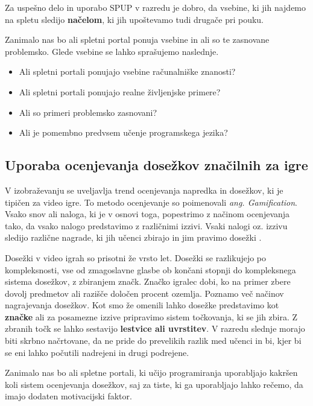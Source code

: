 Za uspešno delo in uporabo SPUP v razredu je dobro, da vsebine, ki jih
najdemo na spletu sledijo \textbf{načelom}, ki jih upoštevamo tudi
drugače pri pouku.

Zanimalo nas bo ali spletni portal ponuja vsebine in ali so te
zasnovane problemsko. Glede vsebine se lahko sprašujemo naslednje.

\begin{itemize}
\tightlist
\item Ali spletni portali ponujajo vsebine računalniške znanosti?
\item Ali spletni portali ponujajo realne življenjske primere?
\item Ali so primeri problemsko zasnovani?
\item Ali je pomembno predvsem učenje programskega jezika?
\end{itemize}

\subsection{Uporaba ocenjevanja dosežkov značilnih za igre}
\label{sec:uporaba_dosežkov}

V izobraževanju se uveljavlja trend ocenjevanja napredka in dosežkov,
ki je tipičen za video igre. To metodo ocenjevanje so poimenovali
\emph{ang. Gamification}. Vsako snov ali naloga, ki je v osnovi toga,
popestrimo z načinom ocenjevanja tako, da vsako nalogo predstavimo z
različnimi izzivi. Vsaki nalogi oz. izzivu sledijo različne nagrade,
ki jih učenci zbirajo in jim pravimo dosežki \cite{web:edublogger}.

Dosežki v video igrah so prisotni že vrsto let. Dosežki se razlikujejo
po kompleksnosti, vse od zmagoslavne glasbe ob končani stopnji do
kompleksnega sistema dosežkov, z zbiranjem značk. Značko igralec dobi,
ko na primer zbere dovolj predmetov ali razišče določen procent
ozemlja. Poznamo več načinov nagrajevanja dosežkov. Kot smo že omenili
lahko dosežke predstavimo kot \textbf{značke} ali za posamezne izzive
pripravimo sistem točkovanja, ki se jih zbira. Z zbranih točk se lahko
sestavijo \textbf{lestvice ali uvrstitev}. V razredu slednje morajo
biti skrbno načrtovane, da ne pride do prevelikih razlik med učenci in
bi, kjer bi se eni lahko počutili nadrejeni in drugi podrejene.

Zanimalo nas bo ali spletne portali, ki učijo programiranja
uporabljajo kakršen koli sistem ocenjevanja dosežkov, saj za tiste, ki
ga uporabljajo lahko rečemo, da imajo dodaten motivacijski faktor.

